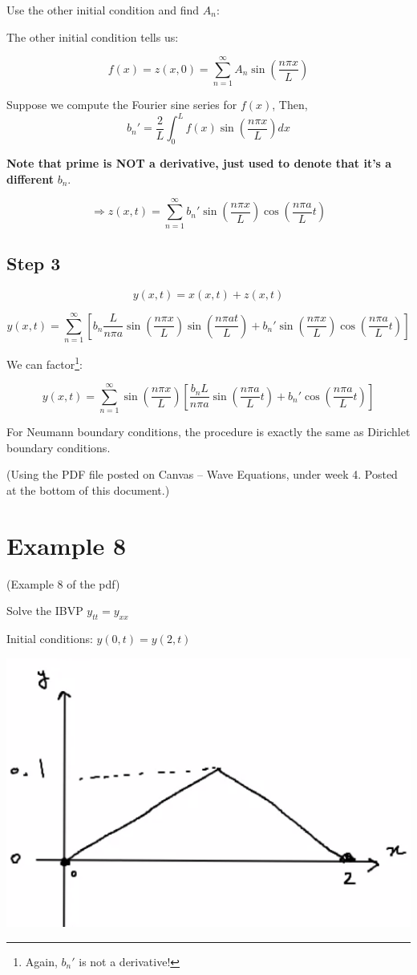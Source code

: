 \documentclass{article}
\begin{document}
Use the other initial condition and find $A_n$:

The other initial condition tells us:

$$f(x) = z(x,0) = \sum_{n =1}^\infty  A_n \sin \left( \frac{n \pi x}{L} \right)$$

Suppose we compute the Fourier sine series for $f(x)$, Then, $$b_n' = \frac{2}{L} \int_0^L f(x) \sin \left( \frac{n \pi x}{L} \right) dx$$

\textbf{Note that prime is NOT a derivative, just used to denote that it's a different} $b_n$.

$$\Rightarrow z(x,t) = \sum_{n = 1}^\infty b_n' \sin \left( \frac{n \pi x}{L} \right) \cos \left( \frac{n \pi a}{L} t \right)$$

\subsection{Step 3}

$$y(x,t) = x(x,t) + z(x,t)$$

$$ y(x,t) = \sum_{n = 1}^\infty \left[ b_n \frac{L}{n \pi a} \sin \left( \frac{n \pi x}{L} \right) \sin \left( \frac{n \pi a t}{L} \right) + b_n' \sin \left( \frac{n \pi x}{L} \right) \cos \left( \frac{n \pi a}{L} t \right) \right]$$

We can factor\footnote{Again, $b_n'$ is not a derivative!}:

$$y(x,t) = \sum_{n = 1}^\infty \sin \left( \frac{n \pi x}{L} \right) \left[ \frac{b_n L}{n \pi a} \sin \left( \frac{n \pi a}{L}  t \right) + b_n' \cos \left( \frac{n \pi a}{L}  t \right) \right]$$

\hfill

For Neumann boundary conditions, the procedure is exactly the same as Dirichlet boundary conditions. 

(Using the PDF file posted on Canvas -- Wave Equations, under week 4. Posted at the bottom of this document.)

\section{Example 8}

(Example 8 of the pdf)

Solve the IBVP $y_{tt} = y_{xx}$

Initial conditions: $y(0,t) = y(2,t)$

\includegraphics[width = 0.8 \textwidth]{image2.png}
\end{document}

